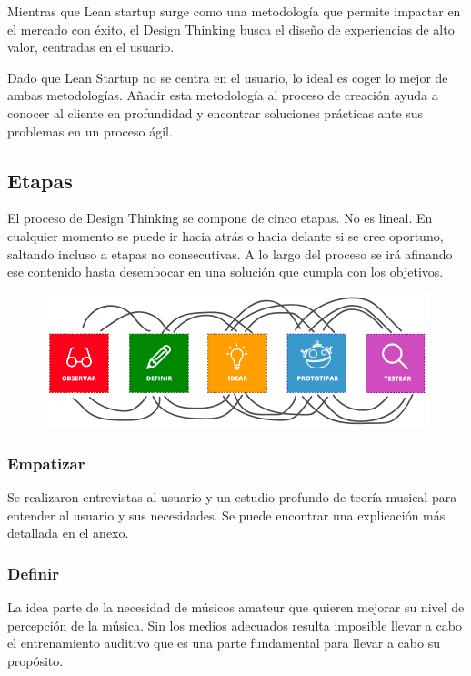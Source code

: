 \documentclass[12pt,twoside,titlepage]{report}
\begin{document}
Mientras que Lean startup surge como una metodología que permite impactar en el mercado con éxito, el Design Thinking busca el diseño de experiencias de alto valor, centradas en el usuario.

Dado que Lean Startup no se centra en el usuario, lo ideal es coger lo mejor de ambas metodologías. Añadir esta metodología al proceso de creación ayuda a conocer al cliente en profundidad y encontrar soluciones prácticas ante sus problemas en un proceso ágil.

\subsection{Etapas}

El proceso de Design Thinking se compone de cinco etapas. No es lineal. En cualquier momento se puede ir hacia atrás o hacia delante si se cree oportuno, saltando incluso a etapas no consecutivas. A lo largo del proceso se irá afinando ese contenido hasta desembocar en una solución que cumpla con los objetivos. 

\begin{figure}[H] 
    \includegraphics[scale=0.44]{Design Thinking/Etapas}
    \centering
    \label{fig:Design Thinking}
\end{figure}

\subsubsection{Empatizar}

Se realizaron entrevistas al usuario y un estudio profundo de teoría musical para entender al usuario y sus necesidades. Se puede encontrar una explicación más detallada en el anexo.
\subsubsection{Definir}

La idea parte de la necesidad de músicos amateur que quieren mejorar su nivel de percepción de la música. Sin los medios adecuados resulta imposible llevar a cabo el entrenamiento auditivo que es una parte fundamental para llevar a cabo su propósito. 
\end{document}
